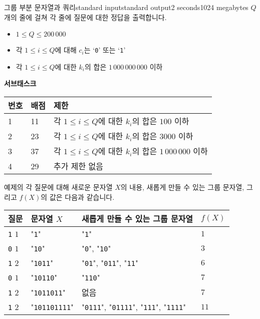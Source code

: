 \begin{problem}{그룹 부분 문자열과 쿼리}{standard input}{standard output}{2 seconds}{1024 megabytes}
\OutputFile
$Q$개의 줄에 걸쳐 각 줄에 질문에 대한 정답을 출력합니다.

\Scoring
\begin{itemize}
\item $1 \le Q \le 200\,000$
\item 각 $1 \le i \le Q$에 대해 $c_i$는 `\texttt{0}' 또는 `\texttt{1}' 
\item 각 $1 \le i \le Q$에 대한 $k_i$의 합은 $1\,000\,000\,000$ 이하
\end{itemize}

\textbf{서브태스크}

\begin{tabular}{|l|l|l|} \hline
  \textbf{번호} & \textbf{배점} & \textbf{제한} \\ \hline
  1 & 11 & 각 $1 \le i \le Q$에 대한 $k_i$의 합은 $100$ 이하 \\ \hline
  2 & 23 & 각 $1 \le i \le Q$에 대한 $k_i$의 합은 $3000$ 이하 \\ \hline
  3 & 37 & 각 $1 \le i \le Q$에 대한 $k_i$의 합은 $1\,000\,000$ 이하 \\ \hline
  4 & 29 & 추가 제한 없음 \\ \hline
\end{tabular}

\Example

\begin{example}
%
\end{example}

\Note
예제의 각 질문에 대해 새로운 문자열 $X$의 내용, 새롭게 만들 수 있는 그룹 문자열, 그리고 $f(X)$의 값은 다음과 같습니다.

\begin{tabular}{|l|l|l|l|} \hline
  \textbf{질문} & \textbf{문자열 $X$} & \textbf{새롭게 만들 수 있는 그룹 문자열} & $f(X)$ \\ \hline
  \texttt{1} $1$ & "\texttt{1}" & "\texttt{1}" & $1$ \\ \hline
  \texttt{0} $1$ & "\texttt{10}" & "\texttt{0}", "\texttt{10}" & $3$ \\ \hline
  \texttt{1} $2$ & "\texttt{1011}" & "\texttt{01}", "\texttt{011}", "\texttt{11}" & $6$ \\ \hline
  \texttt{0} $1$ & "\texttt{10110}" & "\texttt{110}" & $7$ \\ \hline
  \texttt{1} $2$ & "\texttt{1011011}" & 없음 & $7$ \\ \hline
  \texttt{1} $2$ & "\texttt{101101111}" & "\texttt{0111}", "\texttt{01111}", "\texttt{111}", "\texttt{1111}" & $11$ \\ \hline
\end{tabular}

\end{problem}

